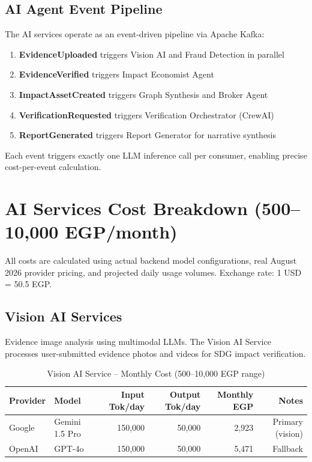 \documentclass[11pt,a4paper]{article}
\begin{document}
\subsection{AI Agent Event Pipeline}

The AI services operate as an event-driven pipeline via Apache Kafka:

\begin{enumerate}[leftmargin=2em]
    \item \textbf{EvidenceUploaded} triggers Vision AI and Fraud Detection in parallel
    \item \textbf{EvidenceVerified} triggers Impact Economist Agent
    \item \textbf{ImpactAssetCreated} triggers Graph Synthesis and Broker Agent
    \item \textbf{VerificationRequested} triggers Verification Orchestrator (CrewAI)
    \item \textbf{ReportGenerated} triggers Report Generator for narrative synthesis
\end{enumerate}

Each event triggers exactly one LLM inference call per consumer, enabling precise cost-per-event calculation.

\newpage

\section{AI Services Cost Breakdown (500--10,000 EGP/month)}

All costs are calculated using actual backend model configurations, real August 2026 provider pricing, and projected daily usage volumes. Exchange rate: 1 USD = 50.5 EGP.

\subsection{Vision AI Services}

Evidence image analysis using multimodal LLMs. The Vision AI Service processes user-submitted evidence photos and videos for SDG impact verification.

\begin{table}[H]
\centering
\begin{tabular}{|l|l|r|r|r|r|}
\hline
\textbf{Provider} & \textbf{Model} & \textbf{Input Tok/day} & \textbf{Output Tok/day} & \textbf{Monthly EGP} & \textbf{Notes} \\
\hline
Google & Gemini 1.5 Pro & 150,000 & 50,000 & 2,923 & Primary (vision) \\
\hline
OpenAI & GPT-4o & 150,000 & 50,000 & 5,471 & Fallback \\
\hline
\end{tabular}
\caption{Vision AI Service -- Monthly Cost (500--10,000 EGP range)}
\end{table}
\end{document}
